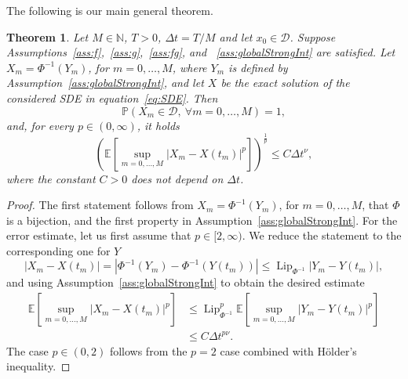 \documentclass[11pt]{amsart}
\newtheorem{theorem}{Theorem}
\newcommand{\N}{{\mathbb N}}
\newcommand{\E}{{\mathbb E}}
\newcommand{\PP}{{\mathbb P}}
\newcommand{\D}{\mathcal{D}}
\newcommand{\Lip}{\operatorname{Lip}}
\begin{document}
{The following is our main general theorem.
\begin{theorem}\label{theo:mainStrong}
Let $M\in\N$, $T > 0$, $\Delta t = T/M$ and let $x_{0} \in \D$.
Suppose Assumptions~\ref{ass:f},~\ref{ass:g},~\ref{ass:fg}, and ~\ref{ass:globalStrongInt} are satisfied. Let $X_{m} = \Phi^{-1}(Y_{m})$, for $m=0,\ldots,M$, where $Y_{m}$ is defined by Assumption~\ref{ass:globalStrongInt}, and let $X$ be the exact solution of the considered SDE in equation~\eqref{eq:SDE}. Then
\begin{equation*}
\PP (X_{m} \in \D,\ \forall m = 0,\ldots,M) = 1,
\end{equation*}
and, for every $p \in (0,\infty)$, it holds
\begin{equation*}
\left( \E \left[ \sup_{m=0, \ldots, M} | X_{m} - X(t_{m}) |^{p} \right] \right)^{\frac{1}{p}} \leq C \Delta t^{\nu},
\end{equation*}
where the constant $C>0$ does not depend on $\Delta t$.
\end{theorem}
\begin{proof}
The first statement follows from $X_{m} = \Phi^{-1}(Y_{m})$, for $m=0,\ldots,M$, that $\Phi$ is a bijection, and the first property in Assumption~\ref{ass:globalStrongInt}. For the error estimate, let us first assume that $p \in [2,\infty)$. We reduce the statement to the corresponding one for $Y$
\begin{equation*}
| X_{m} - X(t_{m}) | = | \Phi^{-1}(Y_{m}) - \Phi^{-1}(Y(t_{m})) | \leq \Lip_{\Phi^{-1}} |Y_{m} - Y(t_{m}) |,
\end{equation*}
and using Assumption~\ref{ass:globalStrongInt} to obtain the desired estimate
\begin{align*}
\E \left[ \sup_{m=0, \ldots, M} | X_{m} - X(t_{m}) |^{p} \right] &\leq \Lip_{\Phi^{-1}}^{p} \E \left[ \sup_{m=0, \ldots, M} | Y_{m} - Y(t_{m}) |^{p} \right] \\ &\leq C \Delta t^{p \nu}.
\end{align*}
The case $p \in (0,2)$ follows from the $p=2$ case combined with Hölder's inequality.
\end{proof}

}
\end{document}
